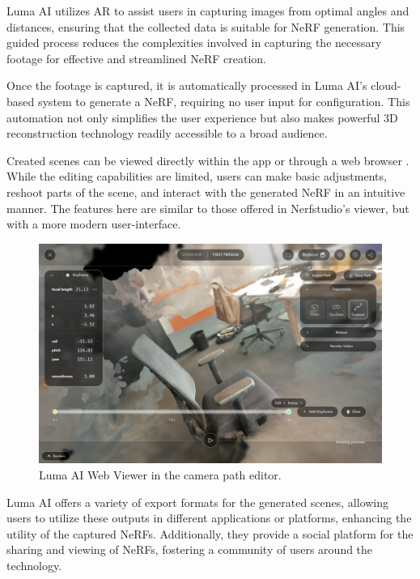 Luma AI utilizes AR to assist users in capturing images from optimal angles and distances, ensuring that the collected data is suitable for NeRF generation.
This guided process reduces the complexities involved in capturing the necessary footage for effective and streamlined NeRF creation.

Once the footage is captured, it is automatically processed in Luma AI’s cloud-based system to generate a NeRF, requiring no user input for configuration.
This automation not only simplifies the user experience but also makes powerful 3D reconstruction technology readily accessible to a broad audience.

Created scenes can be viewed directly within the app or through a web browser . 
While the editing capabilities are limited, users can make basic adjustments, reshoot parts of the scene, and interact with the generated NeRF in an intuitive manner.
The features here are similar to those offered in Nerfstudio's viewer, but with a more modern user-interface.

\begin{figure}[h!]
  \centering
  \includegraphics[width=\textwidth]{figures/related-luma.png}
  \caption{Luma AI Web Viewer in the camera path editor.}
  \label{fig:luma-viewer}
\end{figure}

Luma AI offers a variety of export formats for the generated scenes, allowing users to utilize these outputs in different applications or platforms, enhancing the utility of the captured NeRFs.
Additionally, they provide a social platform for the sharing and viewing of NeRFs, fostering a community of users around the technology.

